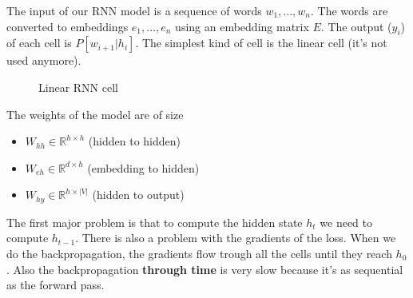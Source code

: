 The input of our RNN model is a sequence of words $w_1,\dots,w_n$. The words are converted to embeddings $e_1,\dots,e_n$ 
using an embedding matrix $E$.
The output ($y_i$) of each cell is $P[w_{i+1}|h_i]$.
The simplest kind of cell is the linear cell (it's not used anymore).

\begin{figure}[H]
    \centering
    \caption{Linear RNN cell}
    \label{fig:linear_rnn_cell}
\end{figure}

The weights of the model are of size
\begin{itemize}
    \item $W_{hh}\in\mathbb{R}^{h\times h}$ (hidden to hidden)
    \item $W_{eh}\in\mathbb{R}^{d\times h}$ (embedding to hidden)
    \item $W_{hy}\in\mathbb{R}^{h\times |V|}$ (hidden to output)
\end{itemize}

The first major problem is that to compute the hidden state $h_t$ we need to compute $h_{t-1}$.
There is also a problem with the gradients of the loss.
When we do the backpropagation, the gradients flow trough all the cells
until they reach $h_0$.
Also the backpropagation \textbf{through time} is very slow because
it's as sequential as the forward pass.

